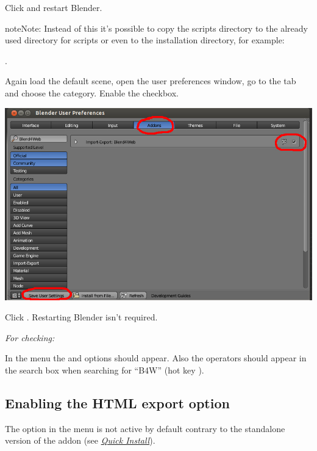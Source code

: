\documentclass[a4paper,12pt,oneside]{sphinxmanual}
\begin{document}
Click  and restart Blender.

\begin{notice}{note}{Note:}
Instead of this it's possible to copy the scripts directory  to the already used directory for scripts or even to the installation directory, for example:

.
\end{notice}

Again load the default scene, open the user preferences window, go to the  tab and choose the  category. Enable the  checkbox.

{\hfill\includegraphics[width=1.000\linewidth]{user_preferences_enable_addon.jpg}\hfill}

\begin{DUlineblock}{0em}
\item[] 
\end{DUlineblock}

Click . Restarting Blender isn't required.

\emph{For checking:}

In the  menu the  and  options should appear. Also the operators should appear in the search box when searching for ``B4W'' (hot key ).


\subsection{Enabling the HTML export option}
\label{setup:html}
The  option in the  menu is not active by default contrary to the standalone version of the addon (see {\hyperref[first_steps:quick-install]{\emph{Quick Install}}}).
\end{document}
